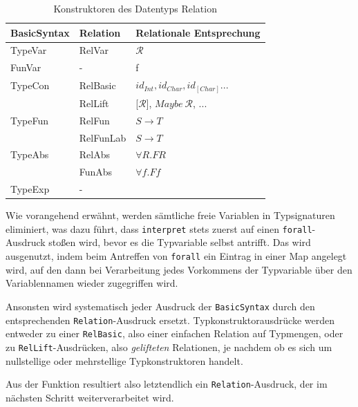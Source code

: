 \begin{table}
\centering
\begin{tabular}{| l | l | l |}
\hline
BasicSyntax & Relation & Relationale Entsprechung\\
\hline
TypeVar & RelVar & $\mathcal{R}$ \\
FunVar & - & f \\
TypeCon & RelBasic & $id_{Int}, id_{Char}, id_{[Char]}...$ \\
& RelLift & [$\mathcal{R}$], $Maybe\ \mathcal{R}$, ... \\
TypeFun & RelFun & $S \rightarrow T$ \\
& RelFunLab & $S \rightarrow T$ \\
TypeAbs & RelAbs & $\forall R . F R$ \\
& FunAbs &$\forall f . F f$\\
TypeExp & - &\\
\hline
\end{tabular}
\caption{Konstruktoren des Datentyps Relation}
\label{tab:relations}
\end{table}

Wie vorangehend erwähnt, werden sämtliche freie Variablen in Typsignaturen eliminiert, was dazu führt, dass \texttt{interpret}
stets zuerst auf einen \texttt{forall}-Ausdruck stoßen wird, bevor es die Typvariable selbst antrifft. Das wird ausgenutzt, indem
beim Antreffen von \texttt{forall} ein Eintrag in einer Map angelegt wird, auf den dann bei Verarbeitung jedes Vorkommens der
Typvariable über den Variablennamen wieder zugegriffen wird.

Ansonsten wird systematisch jeder Ausdruck der \texttt{BasicSyntax} durch den entsprechenden \texttt{Relation}-Ausdruck
ersetzt. Typkonstruktorausdrücke werden entweder zu einer \texttt{RelBasic}, also einer einfachen Relation auf Typmengen,
oder zu \texttt{RelLift}-Ausdrücken, also \textit{gelifteten} Relationen, je nachdem ob es sich um nullstellige oder mehrstellige
Typkonstruktoren handelt.

Aus der Funktion resultiert also letztendlich ein \texttt{Relation}-Ausdruck, der im nächsten Schritt weiterverarbeitet wird.



